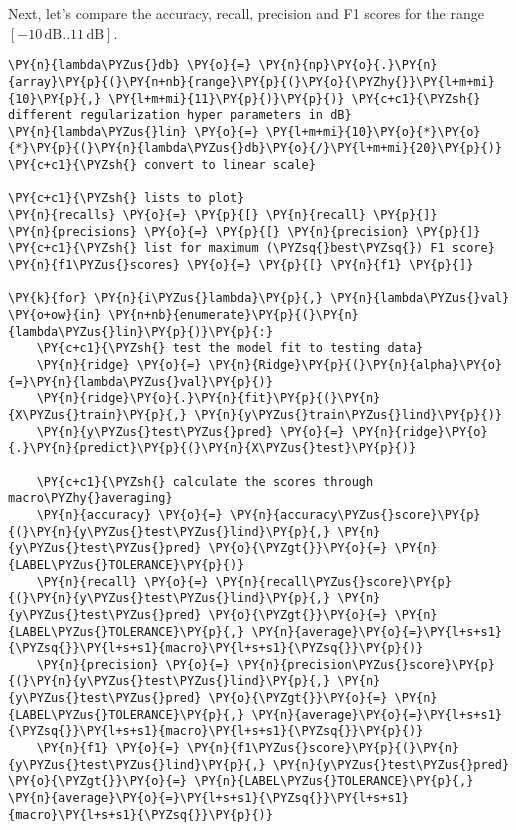     Next, let's compare the accuracy, recall, precision and F1 scores for
the range \([-10\,\text{dB}..11\,\text{dB}]\).

    \begin{tcolorbox}[breakable, size=fbox, boxrule=1pt, pad at break*=1mm,colback=cellbackground, colframe=cellborder]
\begin{Verbatim}[commandchars=\\\{\}]
\PY{n}{lambda\PYZus{}db} \PY{o}{=} \PY{n}{np}\PY{o}{.}\PY{n}{array}\PY{p}{(}\PY{n+nb}{range}\PY{p}{(}\PY{o}{\PYZhy{}}\PY{l+m+mi}{10}\PY{p}{,} \PY{l+m+mi}{11}\PY{p}{)}\PY{p}{)} \PY{c+c1}{\PYZsh{} different regularization hyper parameters in dB}
\PY{n}{lambda\PYZus{}lin} \PY{o}{=} \PY{l+m+mi}{10}\PY{o}{*}\PY{o}{*}\PY{p}{(}\PY{n}{lambda\PYZus{}db}\PY{o}{/}\PY{l+m+mi}{20}\PY{p}{)}      \PY{c+c1}{\PYZsh{} convert to linear scale}

\PY{c+c1}{\PYZsh{} lists to plot}
\PY{n}{recalls} \PY{o}{=} \PY{p}{[} \PY{n}{recall} \PY{p}{]}
\PY{n}{precisions} \PY{o}{=} \PY{p}{[} \PY{n}{precision} \PY{p}{]}
\PY{c+c1}{\PYZsh{} list for maximum (\PYZsq{}best\PYZsq{}) F1 score}
\PY{n}{f1\PYZus{}scores} \PY{o}{=} \PY{p}{[} \PY{n}{f1} \PY{p}{]}

\PY{k}{for} \PY{n}{i\PYZus{}lambda}\PY{p}{,} \PY{n}{lambda\PYZus{}val} \PY{o+ow}{in} \PY{n+nb}{enumerate}\PY{p}{(}\PY{n}{lambda\PYZus{}lin}\PY{p}{)}\PY{p}{:}
    \PY{c+c1}{\PYZsh{} test the model fit to testing data}
    \PY{n}{ridge} \PY{o}{=} \PY{n}{Ridge}\PY{p}{(}\PY{n}{alpha}\PY{o}{=}\PY{n}{lambda\PYZus{}val}\PY{p}{)}
    \PY{n}{ridge}\PY{o}{.}\PY{n}{fit}\PY{p}{(}\PY{n}{X\PYZus{}train}\PY{p}{,} \PY{n}{y\PYZus{}train\PYZus{}lind}\PY{p}{)}
    \PY{n}{y\PYZus{}test\PYZus{}pred} \PY{o}{=} \PY{n}{ridge}\PY{o}{.}\PY{n}{predict}\PY{p}{(}\PY{n}{X\PYZus{}test}\PY{p}{)}

    \PY{c+c1}{\PYZsh{} calculate the scores through macro\PYZhy{}averaging}
    \PY{n}{accuracy} \PY{o}{=} \PY{n}{accuracy\PYZus{}score}\PY{p}{(}\PY{n}{y\PYZus{}test\PYZus{}lind}\PY{p}{,} \PY{n}{y\PYZus{}test\PYZus{}pred} \PY{o}{\PYZgt{}}\PY{o}{=} \PY{n}{LABEL\PYZus{}TOLERANCE}\PY{p}{)}
    \PY{n}{recall} \PY{o}{=} \PY{n}{recall\PYZus{}score}\PY{p}{(}\PY{n}{y\PYZus{}test\PYZus{}lind}\PY{p}{,} \PY{n}{y\PYZus{}test\PYZus{}pred} \PY{o}{\PYZgt{}}\PY{o}{=} \PY{n}{LABEL\PYZus{}TOLERANCE}\PY{p}{,} \PY{n}{average}\PY{o}{=}\PY{l+s+s1}{\PYZsq{}}\PY{l+s+s1}{macro}\PY{l+s+s1}{\PYZsq{}}\PY{p}{)}
    \PY{n}{precision} \PY{o}{=} \PY{n}{precision\PYZus{}score}\PY{p}{(}\PY{n}{y\PYZus{}test\PYZus{}lind}\PY{p}{,} \PY{n}{y\PYZus{}test\PYZus{}pred} \PY{o}{\PYZgt{}}\PY{o}{=} \PY{n}{LABEL\PYZus{}TOLERANCE}\PY{p}{,} \PY{n}{average}\PY{o}{=}\PY{l+s+s1}{\PYZsq{}}\PY{l+s+s1}{macro}\PY{l+s+s1}{\PYZsq{}}\PY{p}{)}
    \PY{n}{f1} \PY{o}{=} \PY{n}{f1\PYZus{}score}\PY{p}{(}\PY{n}{y\PYZus{}test\PYZus{}lind}\PY{p}{,} \PY{n}{y\PYZus{}test\PYZus{}pred} \PY{o}{\PYZgt{}}\PY{o}{=} \PY{n}{LABEL\PYZus{}TOLERANCE}\PY{p}{,} \PY{n}{average}\PY{o}{=}\PY{l+s+s1}{\PYZsq{}}\PY{l+s+s1}{macro}\PY{l+s+s1}{\PYZsq{}}\PY{p}{)}


\end{Verbatim}
\end{tcolorbox}
